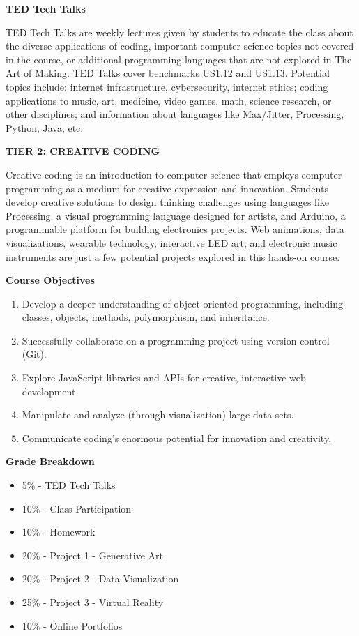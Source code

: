\newpage
\textbf{TED Tech Talks}\par
TED Tech Talks are weekly lectures given by students to educate the class about the diverse applications of coding, important computer science topics not covered in the course, or additional programming languages that are not explored in The Art of Making. TED Talks cover benchmarks US1.12 and US1.13. Potential topics include: internet infrastructure, cybersecurity, internet ethics; coding applications to music, art, medicine, video games, math, science research, or other disciplines; and information about languages like Max/Jitter, Processing, Python, Java, etc.


\clearpage

{\large \textbf{TIER 2: CREATIVE CODING}}\par
Creative coding is an introduction to computer science that employs computer programming as a medium for creative expression and innovation. Students develop creative solutions to design thinking challenges using languages like Processing, a visual programming language designed for artists, and Arduino, a programmable platform for building electronics projects. Web animations, data visualizations, wearable technology, interactive LED art, and electronic music instruments are just a few potential projects explored in this hands-on course.\par


\textbf{Course Objectives}
\begin{enumerate}
	\item Develop a deeper understanding of object oriented programming, including classes, objects, methods, polymorphism, and inheritance.
	\item Successfully collaborate on a programming project using version control (Git).
	\item Explore JavaScript libraries and APIs for creative, interactive web development.
	\item Manipulate and analyze (through visualization) large data sets.  
	\item Communicate coding’s enormous potential for innovation and creativity.
\end{enumerate} \par

\textbf{Grade Breakdown}
\begin{itemize} 
	\item 5\% - TED Tech Talks
	\item 10\% - Class Participation
	\item 10\% - Homework
	\item 20\% - Project 1 - Generative Art
	\item 20\% - Project 2 - Data Visualization
	\item 25\% - Project 3 - Virtual Reality
	\item 10\% - Online Portfolios
\end{itemize} \par

